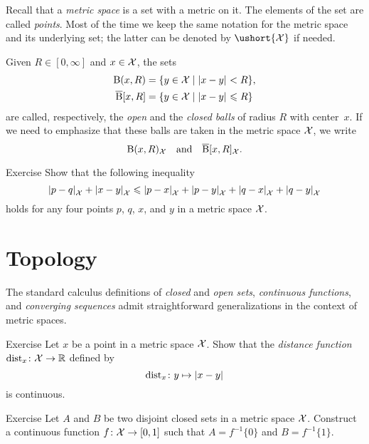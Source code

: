 Recall that a \emph{metric space} is a set with a metric on it.
The elements of the set are called \emph{points}. 
Most of the time we keep the same notation for the metric space and its underlying set;
the latter can be denoted by $\ushort{\spc{X}}$ if needed.

Given $R\in[0,\infty]$ and $x\in \mathcal{X}$, the sets
\begin{align*}
\oBall(x,R)&=\{y\in \spc{X}\mid \dist{x}{y}{}<R\},
\\
\cBall[x,R]&=\{y\in \spc{X}\mid \dist{x}{y}{}\le R\}
\end{align*}
are called, respectively, the  \emph{open} and  the \emph{closed  balls}   of radius $R$ with center~$x$.
If we need to emphasize that these balls are taken in the metric space $\mathcal{X}$,
we write 
\[\mathrm{B}{}(x,R)_{\mathcal{X}}\quad\text{and}\quad\overline{\mathrm{B}}{}[x,R]_{\mathcal{X}}.\]

\begin{thm}{Exercise}\label{ex:quad-inq}
Show that the following inequality
\[\dist{p}{q}{\spc{X}}+\dist{x}{y}{\spc{X}}\le\dist{p}{x}{\spc{X}}+\dist{p}{y}{\spc{X}}+\dist{q}{x}{\spc{X}}+\dist{q}{y}{\spc{X}}\]
holds for any four points $p$, $q$, $x$, and $y$ in a metric space $\mathcal{X}$.
\end{thm}

\section{Topology}

The standard calculus definitions of \emph{closed} and \emph{open sets}, \emph{continuous functions}, and \emph{converging sequences} admit straightforward generalizations in the context of metric spaces.

\begin{thm}{Exercise}\label{ex:cont-dist}
Let $x$ be a point in a metric space $\mathcal{X}$.
Show that the \emph{distance function} $\mathrm{dist}_x\colon\mathcal{X}\to \mathbb{R}$ defined by
\[\distfun_x\:y\mapsto \dist{x}{y}{}\]
is continuous.
\end{thm}


\begin{thm}{Exercise}\label{ex:normal}
Let $A$ and $B$ be two disjoint closed sets in a metric space $\mathcal{X}$.
Construct a continuous function $f\colon\mathcal{X}\to [0,1]$ such that $A=f^{-1}\{0\}$ and $B=f^{-1}\{1\}$.
\end{thm}

